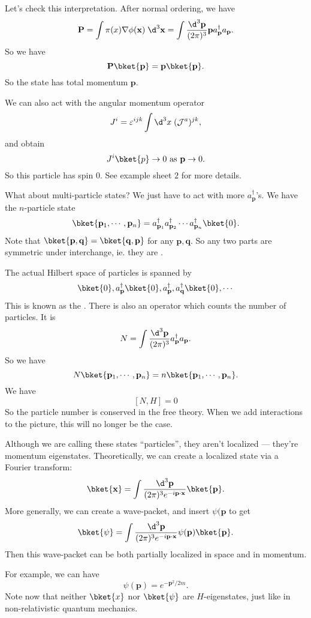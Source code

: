 \documentclass[a4paper]{article}
\begin{document}
Let's check this interpretation. After normal ordering, we have
\[
  \mathbf{P} = \int \pi(x) \nabla \phi(\mathbf{x}) \;\d^3 \mathbf{x} = \int \frac{\d^3 \mathbf{p}}{(2\pi)^3} \mathbf{p} a_\mathbf{p}^\dagger a_\mathbf{p}.
\]
So we have
\[
  \mathbf{P}\bket{\mathbf{p}} = \mathbf{p}\bket{\mathbf{p}}.
\]
So the state has total momentum $\mathbf{p}$.

We can also act with the angular momentum operator
\[
  J^i = \varepsilon^{ijk} \int \d^3 x\; (\mathcal{J}^a)^{jk},
\]
and obtain
\[
  J^i \bket{p} \to 0\text{ as }\mathbf{p} \to 0.
\]
So this particle has spin $0$. See example sheet $2$ for more details.

What about multi-particle states? We just have to act with more $a_\mathbf{p}^\dagger$'s. We have the $n$-particle state
\[
  \bket{\mathbf{p}_1, \cdots, \mathbf{p}_n} = a_{\mathbf{p}_1}^\dagger a_{\mathbf{p}_2}^\dagger \cdots a_{\mathbf{p}_n}^\dagger \bket{0}.
\]
Note that $\bket{\mathbf{p}, \mathbf{q}} = \bket{\mathbf{q}, \mathbf{p}}$ for any $\mathbf{p}, \mathbf{q}$. So any two parts are symmetric under interchange, ie. they are .

The actual Hilbert space of particles is spanned by
\[
  \bket{0}, a_\mathbf{p}^\dagger \bket{0}, a_\mathbf{p}^\dagger, a_\mathbf{q}^{\dagger}\bket{0}, \cdots
\]
This is known as the . There is also an operator which counts the number of particles. It is
\[
  N = \int \frac{\d^3 \mathbf{p}}{(2\pi)^3} a_\mathbf{p}^\dagger a_\mathbf{p}.
\]
So we have
\[
  N\bket{\mathbf{p}_1, \cdots, \mathbf{p}_n} = n\bket{\mathbf{p}_1, \cdots, \mathbf{p}_n}.
\]
We have
\[
  [N, H] = 0
\]
So the particle number is conserved in the free theory. When we add interactions to the picture, this will no longer be the case.

Although we are calling these states ``particles'', they aren't localized --- they're momentum eigenstates. Theoretically, we can create a localized state via a Fourier transform:
\[
  \bket{\mathbf{x}} = \int\frac{\d^3 \mathbf{p}}{(2\pi)^3 e^{-i\mathbf{p}\cdot \mathbf{x}}}\bket{\mathbf{p}}.
\]
More generally, we can create a wave-packet, and insert $\psi(\mathbf{p}$ to get
\[
  \bket{\psi} = \int\frac{\d^3 \mathbf{p}}{(2\pi)^3 e^{-i\mathbf{p}\cdot \mathbf{x}}}\psi(\mathbf{p})\bket{\mathbf{p}}.
\]
Then this wave-packet can be both partially localized in space and in momentum.

For example, we can have
\[
  \psi(\mathbf{p}) = e^{-\mathbf{p}^2/2m}.
\]
Note now that neither $\bket{x}$ nor $\bket{\psi}$ are $H$-eigenstates, just like in non-relativistic quantum mechanics.
\end{document}
